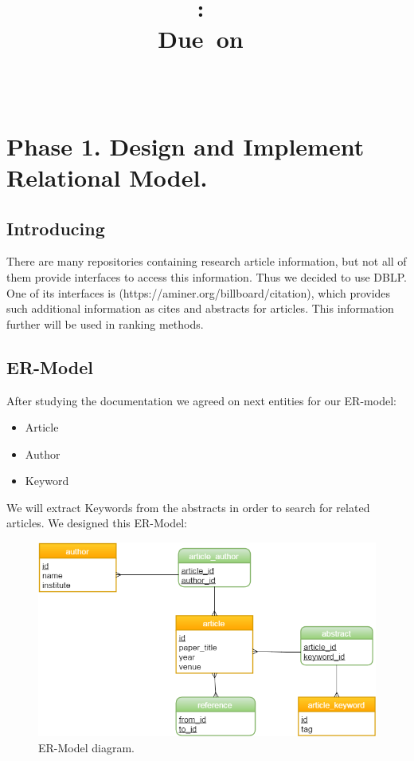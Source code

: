 \documentclass{article}
\title{
\vspace{2in}
\textmd{\textbf{\hmwkClass:\ \hmwkTitle}}\\
\normalsize\vspace{0.1in}\small{Due\ on\ \hmwkDueDate}\\
\vspace{0.1in}\large{\textit{\hmwkClassInstructor\ }}
\vspace{3in}
}
\author{\textbf{\hmwkAuthorName}}
\date{} %
\begin{document}
\maketitle



\newpage
\tableofcontents
\newpage

\section{Phase 1. Design and Implement Relational Model.}

\subsection{Introducing}
There are many repositories containing research article information, but not all of them provide interfaces to access this information. Thus we decided to use DBLP. One of its interfaces is (https://aminer.org/billboard/citation), which provides such additional information as cites and abstracts for articles. This information further will be used in ranking methods. 

\subsection{ER-Model}
After studying the documentation we agreed on next entities for our ER-model: 
\begin{itemize} 
	\item Article
	\item Author
	\item Keyword
\end{itemize} 
We will extract Keywords from the abstracts in order to search for related articles.
We designed this ER-Model:
\newline
\begin{figure}[h!]
  \centering
      \includegraphics[width=1\textwidth]{ER.png}
  \caption{ER-Model diagram.}
\end{figure}
\end{document}
